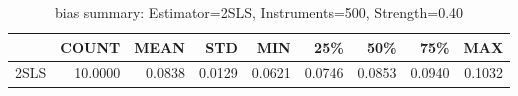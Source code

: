 \begin{table}[ht]
\centering
\caption{bias summary: Estimator=2SLS, Instruments=500, Strength=0.40}
\begin{tabular}{lrrrrrrrr}
\toprule
 & COUNT & MEAN & STD & MIN & 25\% & 50\% & 75\% & MAX \\
\midrule
2SLS & 10.0000 & 0.0838 & 0.0129 & 0.0621 & 0.0746 & 0.0853 & 0.0940 & 0.1032 \\
\bottomrule
\end{tabular}
\end{table}
